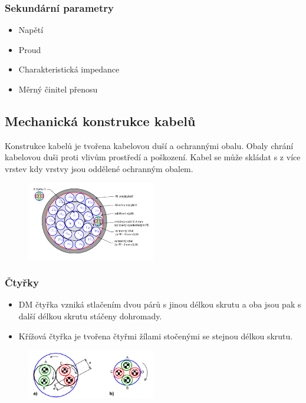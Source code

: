 \subsubsection{Sekundární parametry}
\begin{itemize}
    \item Napětí
    \item Proud
    \item Charakteristická impedance
    \item Měrný činitel přenosu
\end{itemize}

\subsection{Mechanická konstrukce kabelů}

Konstrukce kabelů je tvořena kabelovou duší a ochrannými obalu.
Obaly chrání kabelovou duši proti vlivům prostředí a poškození.
Kabel se může skládat s z více vrstev kdy vrstvy jsou oddělené ochranným obalem.

\begin{figure}[h]
    \centering
    \includegraphics[width=0.5\textwidth]{images/062.png}
\end{figure}

\subsubsection{Čtyřky}
\begin{itemize}
    \item DM čtyřka vzniká stlačením dvou párů s jinou délkou skrutu a oba jsou pak s další délkou skrutu stáčeny dohromady.
    \item Křížová čtyřka je tvořena čtyřmi žílami stočenými se stejnou délkou skrutu.
\end{itemize}

\begin{figure}[h]
    \centering
    \includegraphics[width=0.5\textwidth]{images/063.png}
\end{figure}

